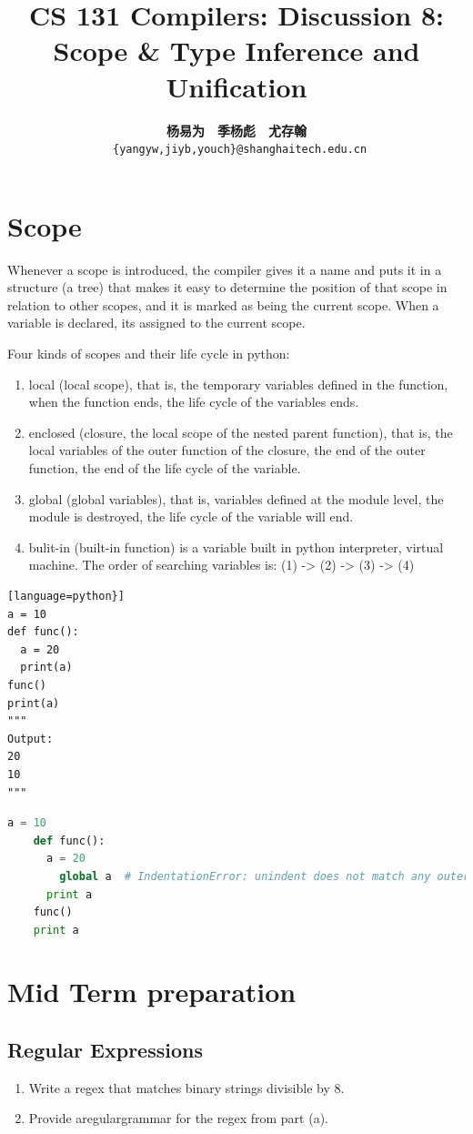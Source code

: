 \documentclass[a4paper]{article}
\title{CS 131 Compilers: Discussion 8: Scope \& Type Inference and Unification}
\author{\textbf{杨易为}~~\textbf{季杨彪}~~\textbf{尤存翰} \\ \texttt{ \{yangyw,jiyb,youch\}@shanghaitech.edu.cn}}
\theoremstyle{definition}
\begin{document}
\maketitle
\section{Scope}
Whenever a scope is introduced, the compiler gives it a name and puts it in a structure (a tree) that makes it easy to determine the position of that scope in relation to other scopes, and it is marked as being the current scope. When a variable is declared, its assigned to the current scope.

Four kinds of scopes and their life cycle in python: 
\begin{enumerate}
    \item local (local scope), that is, the temporary variables defined in the function, when the function ends, the life cycle of the variables ends. 
    \item enclosed (closure, the local scope of the nested parent function), that is, the local variables of the outer function of the closure, the end of the outer function, the end of the life cycle of the variable.
    \item global (global variables), that is, variables defined at the module level, the module is destroyed, the life cycle of the variable will end. 
    \item bulit-in (built-in function) is a variable built in python interpreter, virtual machine. The order of searching variables is: (1) -> (2) -> (3) -> (4)
\end{enumerate}

\begin{enumerate}
\begin{lstlisting}[language=python}]
a = 10
def func():
  a = 20
  print(a)
func()
print(a)
"""
Output:
20
10
"""
\end{lstlisting}

\begin{lstlisting}[language=python]
    a = 10
    def func():
      a = 20
        global a  # IndentationError: unindent does not match any outer indentation level
      print a
    func()
    print a
\end{lstlisting}
\end{enumerate}
\section{Mid Term preparation}
\subsection{Regular Expressions}
\begin{enumerate}
   \item Write a regex that matches binary strings divisible by 8.
   \item Provide aregulargrammar for the regex from part (a).
 \end{enumerate}
\end{document}
